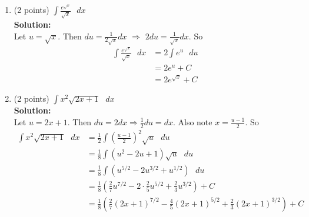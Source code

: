 \documentclass[paper=a4, fontsize=11pt]{scrartcl} %
\numberwithin{equation}{section} %
\numberwithin{figure}{section} %
\numberwithin{table}{section} %
\begin{document}
\begin{enumerate}
\setlength{\itemsep}{0.45in}
\item (2 points) $\displaystyle \int \frac{e^{\sqrt{x}}}{\sqrt{x}} \text{ } dx$\\
\noindent\textbf{Solution:}\\
Let $u = \sqrt{x}$.  Then $du = \frac{1}{2\sqrt{x}}dx$ $\Longrightarrow$ $2 du = \frac{1}{\sqrt{x}} dx$.  So
\begin{align*}
\int \frac{e^{\sqrt{x}}}{\sqrt{x}} \text{ } dx &= 2 \int e^u \text{ } du\\
&=2e^u + C\\
&= 2e^{\sqrt{x}} + C
\end{align*}
\vspace{1.5in}
\item (2 points) $\displaystyle \int x^2\sqrt{2x+1} \text{ } dx$\\
\noindent\textbf{Solution:}\\
Let $u = 2x+1$.  Then $du = 2 dx \Longrightarrow \frac{1}{2} du = dx$.  Also note $x = \frac{u-1}{2}$.  So
\begin{align*}
\int x^2\sqrt{2x+1} \text{ } dx &= \frac{1}{2}\int \left(\frac{u-1}{2}\right)^2\sqrt{u} \text{ } du\\
&= \frac{1}{8}\int (u^2 -2u+1)\sqrt{u} \text{ } du\\
&= \frac{1}{8}\int (u^{5/2} - 2u^{3/2} + u^{1/2})\text{ } du\\
&= \frac{1}{8}\left(\frac{2}{7}u^{7/2}-2\cdot \frac{2}{5}u^{5/2} + \frac{2}{3}u^{3/2} \right) + C \\
&= \frac{1}{8}\left(\frac{2}{7}(2x+1)^{7/2}-\frac{4}{5}(2x+1)^{5/2} + \frac{2}{3}(2x+1)^{3/2} \right) + C
\end{align*}

\newpage


\end{enumerate}
\end{document}
